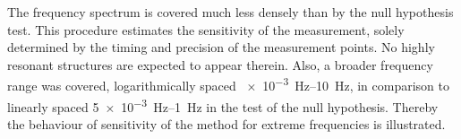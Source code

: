 The frequency spectrum is covered much less densely than by the null hypothesis test. This procedure estimates the sensitivity of the measurement, solely determined by the timing and precision of the measurement points. No highly resonant structures are expected to appear therein.
Also, a broader frequency range was covered, logarithmically spaced \SIrange[range-phrase=--]{e-3}{10}{\hertz}, in comparison to linearly spaced \SIrange[range-phrase=--]{5e-3}{1}{\hertz} in the test of the null hypothesis. Thereby the behaviour of sensitivity of the method for extreme frequencies is illustrated.



